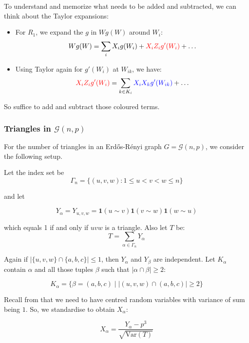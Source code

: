 \documentclass{article}
\begin{document}
\begin{remark}
    To understand and memorize what needs to be added and subtracted, we can think about the Taylor expansions:
    \begin{itemize}
        \item For $R_1$, we expand the $g$ in $Wg(W)$ around $W_i$: 
        \[Wg(W) = \sum_i X_i g(W_i) + \textcolor{red}{X_i Z_i g'(W_i)} + \ldots \]
        \item Using Taylor again for $g'(W_i)$ at $W_{ik}$, we have:
        \[
        \textcolor{red}{X_i Z_i g'(W_i)} = \sum_{k\in K_i} \textcolor{blue}{X_i X_k g'(W_{ik})} + \ldots
            \]
    \end{itemize}
    So suffice to add and subtract those coloured terms.  
\end{remark}

\subsubsection{Triangles in $\mathcal{G}(n,p)$}
For the number of triangles in an Erd\H{o}s-R\'{e}nyi graph $G=\mathcal{G}(n,p)$, we consider the following setup.  

Let the index set be 
\[
\Gamma_n = \{(u,v,w): 1\leq u<v<w\leq n\}
\]

and let 

\[
Y_\alpha = Y_{u,v,w} = \mathbf{1}(u\sim v) \mathbf{1}(v\sim w) \mathbf{1}(w\sim u)
\]

which equals 1 if and only if $uvw$ is a triangle. Also let $T$ be:
\[
T = \sum_{\alpha \in \Gamma_n} Y_\alpha
\]

Again if $|\{u,v,w\}\cap \{a,b,c\}|\leq 1$, then $Y_\alpha$ and $Y_\beta$ are independent. Let $K_\alpha$ contain $\alpha$ and all those tuples $\beta$ such that $|\alpha\cap \beta|\geq 2$:

\begin{equation*}
    K_{\alpha} = \{\beta = (a,b,c) \mid |(u,v,w)\cap (a,b,c)|\geq 2\}
\end{equation*}

Recall from  that we need to have centred random variables with variance of sum being $1$. So, we standardise to obtain $X_\alpha$:

\begin{equation}\label{eq:standardise_triangle}    
    X_{\alpha}=\frac{Y_{\alpha}-p^{3}}{\sqrt{\mathrm{Var}(T)}}
\end{equation}
\end{document}
